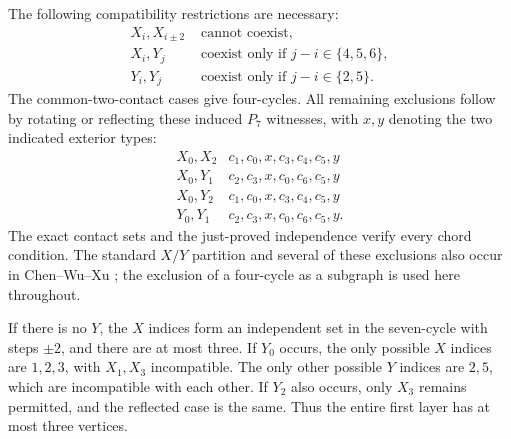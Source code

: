 \documentclass[11pt,a4paper]{article}
\theoremstyle{definition}\newtheorem{definition}[theorem]{Definition}
\theoremstyle{remark}\newtheorem{remark}[theorem]{Remark}
\begin{document}
The following compatibility restrictions are necessary:
\begin{align}
 X_i,X_{i\pm2}&\text{ cannot coexist},\label{local15:eq:xx}\\
 X_i,Y_j&\text{ coexist only if }j-i\in\{4,5,6\},\label{local15:eq:xy}\\
 Y_i,Y_j&\text{ coexist only if }j-i\in\{2,5\}.
 \label{local15:eq:yy}
\end{align}
The common-two-contact cases give four-cycles. All remaining exclusions
follow by rotating or reflecting these induced $P_7$ witnesses, with
$x,y$ denoting the two indicated exterior types:
\[
\begin{array}{c|l}
X_0,X_2&c_1,c_0,x,c_3,c_4,c_5,y\\
X_0,Y_1&c_2,c_3,x,c_0,c_6,c_5,y\\
X_0,Y_2&c_1,c_0,x,c_3,c_4,c_5,y\\
Y_0,Y_1&c_2,c_3,x,c_0,c_6,c_5,y.
\end{array}
\]
The exact contact sets and the just-proved independence verify every
chord condition. The standard $X/Y$ partition and several of these
exclusions also occur in Chen--Wu--Xu \cite[proof of Theorem~1.1,
claims (1)--(6)]{src:cwx}; the exclusion of a four-cycle as a subgraph is
used here throughout.

If there is no $Y$, the $X$ indices form an independent set in the
seven-cycle with steps $\pm2$, and there are at most three. If $Y_0$
occurs, the only possible $X$ indices are $1,2,3$, with $X_1,X_3$
incompatible. The only other possible $Y$ indices are $2,5$, which are
incompatible with each other. If $Y_2$ also occurs, only $X_3$ remains
permitted, and the reflected case is the same. Thus the entire first
layer has at most three vertices.
\end{document}
